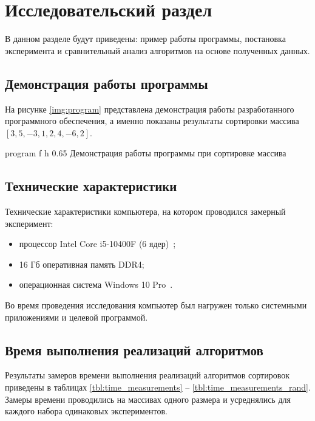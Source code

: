 \chapter{Исследовательский раздел}

В данном разделе будут приведены: пример работы программы, постановка эксперимента и сравнительный анализ алгоритмов на основе полученных данных.

\section{Демонстрация работы программы}


На рисунке \ref{img:program} представлена демонстрация работы разработанного программного обеспечения, а именно показаны результаты сортировки массива $[3, 5, -3, 1, 2, 4, -6, 2]$.

{program} %
{f} %
{h} %
{0.65\textwidth} %
{Демонстрация работы программы при сортировке массива} %

\clearpage


\section{Технические характеристики}

Технические характеристики компьютера, на котором проводился замерный эксперимент:
\begin{itemize}
	\item процессор Intel Core i5-10400F (6 ядер)~\cite{intel};
	\item 16 Гб оперативная память DDR4;
	\item операционная система Windows 10 Pro~\cite{windows}.
\end{itemize}

Во время проведения исследования компьютер был нагружен только системными приложениями и целевой программой.

\section{Время выполнения реализаций алгоритмов}

Результаты замеров времени выполнения реализаций алгоритмов сортировок приведены в таблицах \ref{tbl:time_measurements} -- \ref{tbl:time_measurements_rand}.
Замеры времени проводились на массивах одного размера и усреднялись для каждого набора одинаковых экспериментов.

